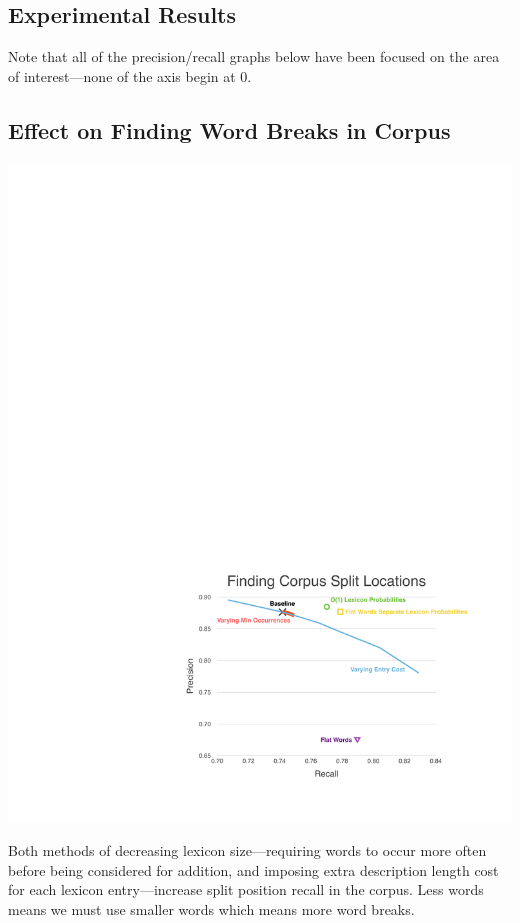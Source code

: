 \documentclass[11pt, oneside, fleqn]{article}
\begin{document}
	\pagebreak

  \subsection{Experimental Results}

  Note that all of the precision/recall graphs below have been focused on the area of interest---none of the axis begin at 0.

  \subsection{Effect on Finding Word Breaks in Corpus}

	\vspace{1em}
  \includegraphics[scale=0.9]{./figure/finding_corpus_split_location.pdf}

  Both methods of decreasing lexicon size---requiring words to occur more often before being considered for addition, and imposing extra description length cost for each lexicon entry---increase split position recall in the corpus. Less words means we must use smaller words which means more word breaks.
\end{document}
